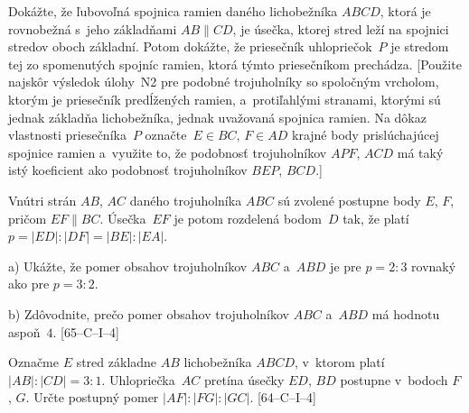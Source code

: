 {Dokážte, že ľubovoľná spojnica ramien daného lichobežníka $ABCD$,
ktorá je rovnobežná s~jeho základňami $AB\parallel CD$, je úsečka, ktorej
stred leží na spojnici stredov oboch základní. Potom dokážte, že
priesečník uhlopriečok~$P$ je stredom tej zo spomenutých spojníc ramien,
ktorá týmto priesečníkom prechádza. [Použite najskôr
výsledok úlohy~N2 pre podobné trojuholníky so spoločným vrcholom,
ktorým je priesečník predĺžených ramien, a~protiľahlými stranami,
ktorými sú jednak základňa lichobežníka, jednak uvažovaná spojnica ramien.
Na dôkaz vlastnosti priesečníka~$P$ označte~$E\in BC$, $F\in AD$
krajné body prislúchajúcej spojnice ramien
a~využite to, že podobnosť trojuholníkov $APF$, $ACD$ má taký istý koeficient
ako podobnosť trojuholníkov $BEP$, $BCD$.]

\D
Vnútri strán $AB$, $AC$ daného trojuholníka $ABC$ sú zvolené postupne
body $E$, $F$, pričom $EF \parallel BC$. Úsečka~$EF$
je potom rozdelená bodom~$D$ tak, že platí
$p = |ED|:|DF| = |BE|:|EA|$.
\item{a)} Ukážte, že pomer obsahov trojuholníkov $ABC$ a~$ABD$ je pre $p=2:3$ rovnaký
ako pre $p=3:2$.
\item{b)} Zdôvodnite, prečo pomer obsahov trojuholníkov $ABC$ a~$ABD$ má hodnotu
aspoň~$4$. [65--C--I--4]

Označme $E$ stred základne $AB$ lichobežníka $ABCD$, v~ktorom platí
$|AB|:|CD|={3:1}$. Uhlopriečka~$AC$ pretína úsečky $ED$, $BD$ postupne
v~bodoch $F$, $ G$. Určte postupný pomer
$|AF|:|FG|:|GC|$.
[64--C--I--4]
}

